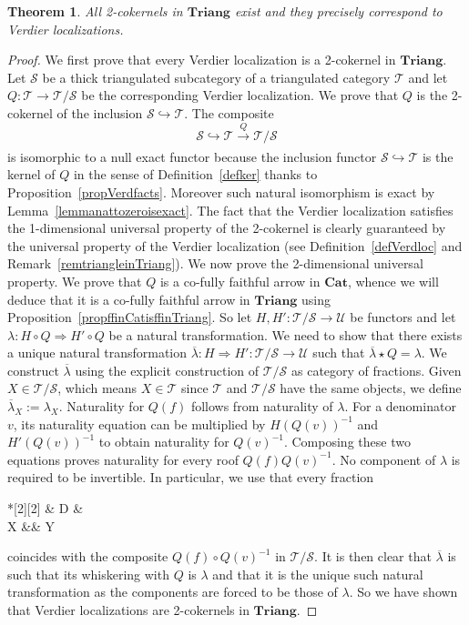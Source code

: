 \documentclass[11pt,reqno,a4paper]{amsart}
\newtheorem{theorem}{Theorem}[section]
\theoremstyle{definition}
\theoremstyle{remark}
\def\nameit#1{\textrm{#1}~}
\def\prox{\nameit{Proposition}}
\def\lemx{\nameit{Lemma}}
\def\defx{\nameit{Definition}}
\def\remx{\nameit{Remark}}
\newcommand{\T}{\mathcal{T}}
\renewcommand{\S}{\mathcal{S}}
\newcommand{\U}{\mathcal{U}}
\newcommand{\0}{\mathbf{0}}
\renewcommand{\1}{\mathbf{1}}
\newcommand{\Cat}{\mathbf{Cat}}
\newcommand{\Triang}{\mathbf{Triang}}
\def\:{\colon}
\def\c{\circ}
\newcommand{\aar}[2][]{\xrightarrow[#1]{#2}}
\begin{document}
\begin{theorem}\label{teorchar2coker1}
 All 2-cokernels in $\Triang$ exist and they precisely correspond to Verdier localizations.
\end{theorem}
\begin{proof}
   We first prove that every Verdier localization is a 2-cokernel in $\Triang$. Let $\S$ be a thick triangulated subcategory of a triangulated category $\T$ and let $Q\: \T \to \T /\S$ be the corresponding Verdier localization. We prove that $Q$ is the 2-cokernel of the inclusion $\S\hookrightarrow \T$. The composite
   $$\S \hookrightarrow \T \aar{Q} \T / \S$$
   is isomorphic to a null exact functor because the inclusion functor $\S \hookrightarrow \T$ is the kernel of $Q$ in the sense of \defx \ref{defker} thanks to \prox \ref{propVerdfacts}. Moreover such natural isomorphism is exact by \lemx\ref{lemmanattozeroisexact}. The fact that the Verdier localization satisfies the 1-dimensional universal property of the 2-cokernel is clearly guaranteed by the universal property of the Verdier localization (see \defx \ref{defVerdloc} and \remx\ref{remtriangleinTriang}). We now prove the 2-dimensional universal property. We prove that $Q$ is a co-fully faithful arrow in $\Cat$, whence we will deduce that it is a co-fully faithful arrow in $\Triang$ using \prox\ref{propffinCatisffinTriang}. So let $H,H'\: \T/\S \to \U$ be functors and let $\lambda\:H \c Q \Rightarrow H' \c Q$ be a natural transformation. We need to show that there exists a unique natural transformation $\overline{\lambda}\: H \Rightarrow H'\:\T/\S\to \U$ such that $\overline{\lambda}\star Q=\lambda$. We construct $\overline{\lambda}$ using the explicit construction of $\T/\S$ as category of fractions. Given $X\in \T/\S$, which means $X\in \T$ since $\T$ and $\T/\S$ have the same objects, we define $\overline{\lambda}_X:= \lambda_X$. Naturality for $Q(f)$ follows from naturality of $\lambda$. For a denominator $v$, its naturality equation can be multiplied by $H(Q(v))^{-1}$ and $H'(Q(v))^{-1}$ to obtain naturality for $Q(v)^{-1}$. Composing these two equations proves naturality for every roof $Q(f)Q(v)^{-1}$. No component of $\lambda$ is required to be invertible. In particular, we use that every fraction \begin{cd}*[2][2] \& D \& \\[-2ex]
	X \&\& Y
	\arrow["v"', from=1-2, to=2-1]
	\arrow["f", from=1-2, to=2-3]\end{cd} coincides with the composite $Q(f)\c Q(v)^{-1}$ in $\T/\S$. It is then clear that $\overline{\lambda}$ is such that its whiskering with $Q$ is $\lambda$ and that it is the unique such natural transformation as the components are forced to be those of $\lambda$. So we have shown that Verdier localizations are 2-cokernels in $\Triang$.


\end{proof}
\end{document}
